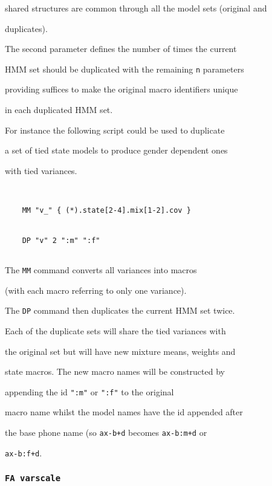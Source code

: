shared structures are common through all the model sets (original and


duplicates).


The second parameter defines the number of times the current


HMM set should be duplicated with the remaining \texttt{n} parameters


providing suffices to make the original macro identifiers unique


in each duplicated HMM set.





For instance the following script could be used to duplicate


a set of tied state models to produce gender dependent ones


with tied variances.


\begin{verbatim}


    MM "v_" { (*).state[2-4].mix[1-2].cov }


    DP "v" 2 ":m" ":f" 


\end{verbatim}


The \texttt{MM} command converts all variances into macros


(with each macro referring to only one variance).


The \texttt{DP} command then duplicates the current HMM set twice.


Each of the duplicate sets will share the tied variances with


the original set but will have new mixture means, weights and


state macros.  The new macro names will be constructed by


appending the id \texttt{":m"} or \texttt{":f"} to the original 


macro name whilst the model names have the id appended after


the base phone name (so \texttt{ax-b+d} becomes \texttt{ax-b:m+d} or


\texttt{ax-b:f+d}.





\subsubsection*{\tt FA varscale}





